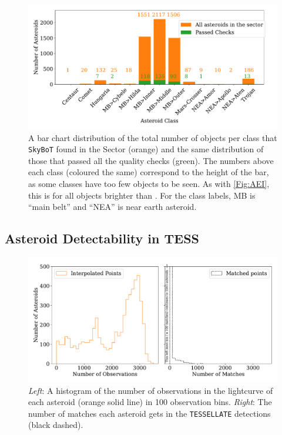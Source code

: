 \documentclass{UCreport}
\begin{document}
\begin{figure}
  \centering
  \includegraphics[width=\textwidth]{./Figures/classesBarqualCut.pdf}
  \caption[Class distribution]{A bar chart distribution of the total number of objects per class that \texttt{SkyBoT} found in the Sector (orange) and the same distribution of those that passed all the quality checks (green).
    The numbers above each class (coloured the same) correspond to the height of the bar, as some classes have too few objects to be seen.
    As with \autoref{Fig:AEI}, this is for all objects brighter than \unit{\mag}.
    For the class labels, MB is ``main belt'' and ``NEA'' is near earth asteroid.}
  \label{Fig:NumPerClass}
\end{figure}

\subsection{Asteroid Detectability in TESS} \label{SubSec:Detect}

\begin{figure}
  \centering
  \includegraphics[width=\textwidth]{./Figures/pointsMatchesNumberHistdoubleChangedbound.pdf}
  \caption[Number of observations or matches]{\textit{Left}: A histogram of the number of observations in the lightcurve of each asteroid (orange solid line) in 100 observation bins. \textit{Right}: The number of matches each asteroid gets in the \texttt{TESSELLATE} detections (black dashed).
  }
  \label{Fig:MatchInterpHists}
\end{figure}
\end{document}
